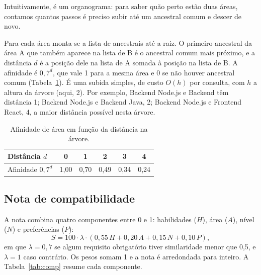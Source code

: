 \documentclass[12pt]{article}
\begin{document}
Intuitivamente, é um organograma: para saber quão perto estão duas áreas, contamos quantos passos é preciso subir até um ancestral comum e descer de novo.

Para cada área monta-se a lista de ancestrais até a raiz. O primeiro ancestral da área A que também aparece na lista de B é o ancestral comum mais próximo, e a distância $d$ é a posição dele na lista de A somada à posição na lista de B. A afinidade é $0{,}7^{d}$, que vale 1 para a mesma área e 0 se não houver ancestral comum (Tabela~\ref{tab:afin}). É uma subida simples, de custo $O(h)$ por consulta, com $h$ a altura da árvore (aqui, 2). Por exemplo, Backend Node.js e Backend têm distância 1; Backend Node.js e Backend Java, 2; Backend Node.js e Frontend React, 4, a maior distância possível nesta árvore.

\begin{table}[ht]
\centering
\caption{Afinidade de área em função da distância na árvore.}
\label{tab:afin}
\begin{tabular}{lccccc}
\hline
Distância $d$ & 0 & 1 & 2 & 3 & 4 \\
\hline
Afinidade $0{,}7^{d}$ & 1,00 & 0,70 & 0,49 & 0,34 & 0,24 \\
\hline
\end{tabular}
\end{table}

\subsection{Nota de compatibilidade}

A nota combina quatro componentes entre 0 e 1: habilidades ($H$), área ($A$), nível ($N$) e preferências ($P$):
\begin{equation}
S = 100 \cdot \lambda \cdot (0{,}55\,H + 0{,}20\,A + 0{,}15\,N + 0{,}10\,P),
\end{equation}
em que $\lambda = 0{,}7$ se algum requisito obrigatório tiver similaridade menor que 0,5, e $\lambda = 1$ caso contrário. Os pesos somam 1 e a nota é arredondada para inteiro. A Tabela~\ref{tab:comp} resume cada componente.
\end{document}
